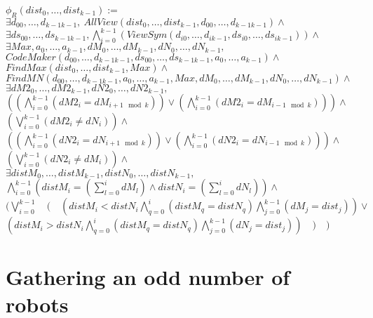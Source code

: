 \documentclass{article}
\begin{document}
\begin{center}

$\phi_R(dist_{0}, \ldots ,dist_{k-1}):=$\\
$\exists d_{00}, \ldots ,d_{k-1k-1},\ AllView(dist_{0}, \ldots ,dist_{k-1}, d_{00}, \ldots ,d_{k-1k-1})\land$\\
$\exists ds_{00}, \ldots ,ds_{k-1k-1}, \bigwedge_{i=0}^{k-1} (ViewSym(d_{i0}, \ldots , d_{ik-1}, ds_{i0}, \ldots , ds_{ik-1}))\land$\\
$\exists Max, a_{0}, \ldots , a_{k-1}, dM_{0}, \dots, dM_{k-1}, dN_{0}, \dots, dN_{k-1},$\\
$CodeMaker(d_{00}, \ldots ,d_{k-1k-1}, ds_{00}, \ldots ,ds_{k-1k-1}, a_{0}, \ldots , a_{k-1})\land$\\
$FindMax(dist_{0}, \ldots ,dist_{k-1}, Max) \land$\\
$FindMN(d_{00}, \ldots ,d_{k-1k-1}, a_{0}, \ldots , a_{k-1}, Max,  dM_{0}, \dots, dM_{k-1}, dN_{0}, \dots, dN_{k-1}) \land $\\
$\exists dM2_{0}, \dots, dM2_{k-1}, dN2_{0}, \dots, dN2_{k-1},$\\
$( (\bigwedge_{i = 0}^{k-1} (dM2_{i} = dM_{i+1 \mod{k}}) ) \lor (\bigwedge_{i = 0}^{k-1} (dM2_{i} = dM_{i-1 \mod{k}})) ) \land$\\
$(\bigvee_{i = 0}^{k-1} (dM2_{i} \not= dN_{i}) ) \land $\\
$( (\bigwedge_{i = 0}^{k-1} (dN2_{i} = dN_{i+1 \mod{k}}) ) \lor (\bigwedge_{i = 0}^{k-1} (dN2_{i} = dN_{i-1 \mod{k}})) ) \land$\\
$(\bigvee_{i = 0}^{k-1} (dN2_{i} \not= dM_{i}) ) \land $\\

$\exists distM_{0}, \ldots , distM_{k-1}, distN_{0}, \ldots , distN_{k-1},$\\
$\bigwedge_{i=0}^{k-1}(distM_{i} = (\sum_{l=0}^i dM_{l}) \land distN_{i} = (\sum_{l=0}^i dN_{l}) ) \land $\\
$(\bigvee_{i=0}^{k-1}\quad (\quad (distM_{i} < distN_{i} \bigwedge_{q=0}^{i} (distM_{q} = distN_{q}) \bigwedge_{j = 0}^{k-1} (dM_{j} = dist_{j}) ) \lor $\\
$(distM_{i} > distN_{i} \bigwedge_{q=0}^{i} (distM_{q} = distN_{q}) \bigwedge_{j = 0}^{k-1} (dN_{j} = dist_{j}) )\quad )\quad )$
\end{center}

\section{Gathering an odd number of robots}
\end{document}
